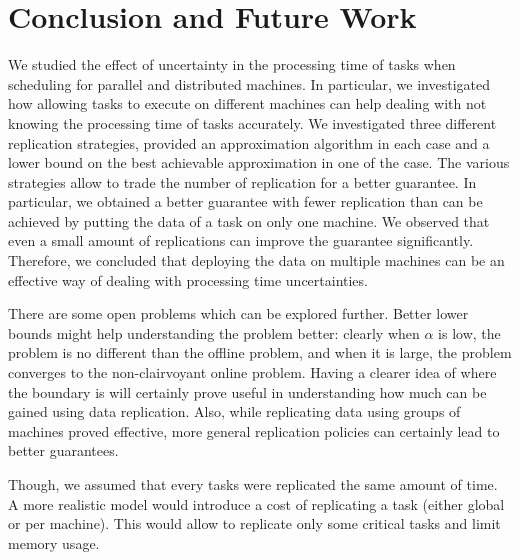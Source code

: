 \documentclass[twocolumn]{svjour3}
\begin{document}
\newpage


\section{Conclusion and Future Work}\label{sec8}

We studied the effect of uncertainty in the processing time of tasks
when scheduling for parallel and distributed machines. In particular, we
investigated how allowing tasks to execute on different machines can
help dealing with not knowing the processing time of tasks
accurately. We investigated three different replication strategies,
provided an approximation algorithm in each case and a lower bound on the
best achievable approximation in one of the case. The various
strategies allow to trade the number of replication for a better
guarantee. In particular, we obtained a better guarantee with fewer
replication than can be achieved by putting the data of a task on only
one machine. We observed that even a small amount of replications can
improve the guarantee significantly. Therefore, we concluded that
deploying the data on multiple machines can be an effective way of
dealing with processing time uncertainties.

There are some open problems which can be explored further. Better
lower bounds might help understanding the problem better: clearly when
$\alpha$ is low, the problem is no different than the offline problem,
and when it is large, the problem converges to the non-clairvoyant
online problem. Having a clearer idea of where the boundary is will
certainly prove useful in understanding how much can be gained using
data replication. Also, while replicating data using groups of
machines proved effective, more general replication policies can
certainly lead to better guarantees.

Though, we assumed that every tasks were replicated the same amount of
time. A more realistic model would introduce a cost of replicating a
task (either global or per machine). This would allow to replicate
only some critical tasks and limit memory usage.


 
\end{document}
